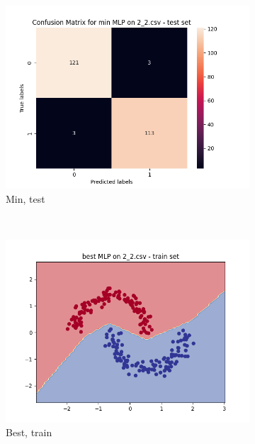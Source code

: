 \documentclass[12pt]{article}
\newcommand*{\subfigwidth}{0.24\textwidth}
\begin{document}
\begin{figure}[H]
\begin{subfigure}[t]{\subfigwidth}
        \includegraphics[width=\linewidth]{img/exp_2/mlp/2_2/min/test_matrix.png}
        \caption{Min, test}
    \end{subfigure} 
    \\
    \begin{subfigure}[t]{\subfigwidth}
        \includegraphics[width=\linewidth]{img/exp_2/mlp/2_2/best/train_boundary.png}
        \caption{Best, train}
    \end{subfigure}
    \hfill
    \begin{subfigure}[t]{\subfigwidth}

\end{subfigure}
\end{figure}
\end{document}
